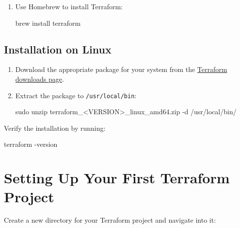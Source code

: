 \documentclass[
  letterpaper,
  DIV=11,
  numbers=noendperiod]{scrreprt}
\newenvironment{Shaded}{\begin{snugshade}}{\end{snugshade}}
\newcommand{\AttributeTok}[1]{\textcolor[rgb]{0.40,0.45,0.13}{#1}}
\newcommand{\ExtensionTok}[1]{\textcolor[rgb]{0.00,0.23,0.31}{#1}}
\newcommand{\FunctionTok}[1]{\textcolor[rgb]{0.28,0.35,0.67}{#1}}
\newcommand{\NormalTok}[1]{\textcolor[rgb]{0.00,0.23,0.31}{#1}}
\newcommand{\OperatorTok}[1]{\textcolor[rgb]{0.37,0.37,0.37}{#1}}
\begin{document}
\begin{enumerate}
\def\labelenumi{\arabic{enumi}.}
\item
  Use Homebrew to install Terraform:

\begin{Shaded}
\begin{Highlighting}[]
\ExtensionTok{brew}\NormalTok{ install terraform}
\end{Highlighting}
\end{Shaded}
\end{enumerate}

\subsection{Installation on Linux}\label{installation-on-linux}

\begin{enumerate}
\def\labelenumi{\arabic{enumi}.}
\item
  Download the appropriate package for your system from the
  \href{https://www.terraform.io/downloads.html}{Terraform downloads
  page}.
\item
  Extract the package to \texttt{/usr/local/bin}:

\begin{Shaded}
\begin{Highlighting}[]
\FunctionTok{sudo}\NormalTok{ unzip terraform\_}\OperatorTok{\textless{}}\NormalTok{VERSION}\OperatorTok{\textgreater{}}\NormalTok{\_linux\_amd64.zip }\AttributeTok{{-}d}\NormalTok{ /usr/local/bin/}
\end{Highlighting}
\end{Shaded}
\end{enumerate}

Verify the installation by running:

\begin{Shaded}
\begin{Highlighting}[]
\ExtensionTok{terraform} \AttributeTok{{-}version}
\end{Highlighting}
\end{Shaded}

\section{Setting Up Your First Terraform
Project}\label{setting-up-your-first-terraform-project}

Create a new directory for your Terraform project and navigate into it:
\end{document}
